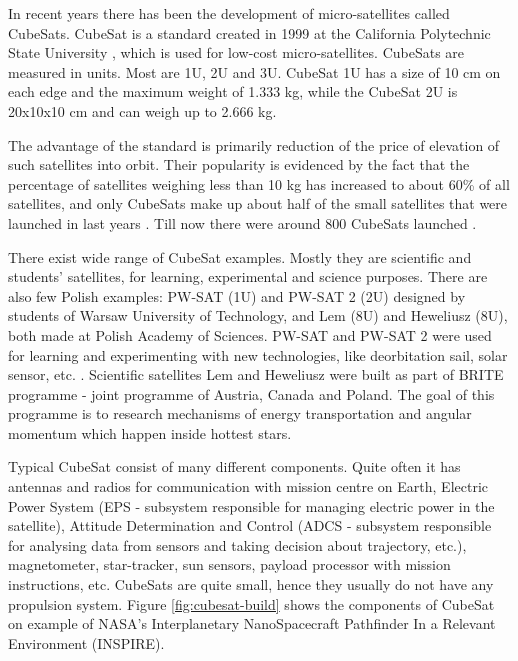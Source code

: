 \documentclass[12pt,a4paper,oneside]{article}
\begin{document}
In recent years there has been the development of micro-satellites called CubeSats. CubeSat is a standard created in 1999 at the California Polytechnic State University \cite{heidt2000cubesat}, which is used for low-cost micro-satellites. CubeSats are measured in units. Most are 1U, 2U and 3U. CubeSat 1U has a size of 10 cm on each edge and the maximum weight of 1.333 kg, while the CubeSat 2U is 20x10x10 cm and can weigh up to 2.666 kg.

The advantage of the standard is primarily reduction of the price of elevation of such satellites into orbit. Their popularity is evidenced by the fact that the percentage of satellites weighing less than 10 kg has increased to about 60\% of all satellites, and only CubeSats make up about half of the small satellites that were launched in last years \cite{swartwout2011brief}\cite{swartwout2013first}. Till now there were around 800 CubeSats launched \cite{nanosats}.

There exist wide range of CubeSat examples. Mostly they are scientific and students' satellites, for learning, experimental and science purposes. There are also few Polish examples: PW-SAT (1U) and PW-SAT 2 (2U) designed by students of Warsaw University of Technology, and Lem (8U) and Heweliusz (8U), both made at Polish Academy of Sciences. PW-SAT and PW-SAT 2 were used for learning and experimenting with new technologies, like deorbitation sail, solar sensor, etc. \cite{pw-sat2}.
Scientific satellites Lem and Heweliusz were built as part of BRITE programme - joint programme of Austria, Canada and Poland. The goal of this programme is to research mechanisms of energy transportation and angular momentum which happen inside hottest stars\cite{brite-pl}.

Typical CubeSat consist of many different components. Quite often it has antennas and radios for communication with mission centre on Earth, Electric Power System (EPS - subsystem responsible for managing electric power in the satellite), Attitude Determination and Control (ADCS - subsystem responsible for analysing data from sensors and taking decision about trajectory, etc.), magnetometer, star-tracker, sun sensors, payload processor with mission instructions, etc. CubeSats are quite small, hence they usually do not have any propulsion system. Figure \ref{fig:cubesat-build} shows the components of CubeSat on example of NASA's Interplanetary NanoSpacecraft Pathfinder In a Relevant Environment (INSPIRE).
\end{document}
